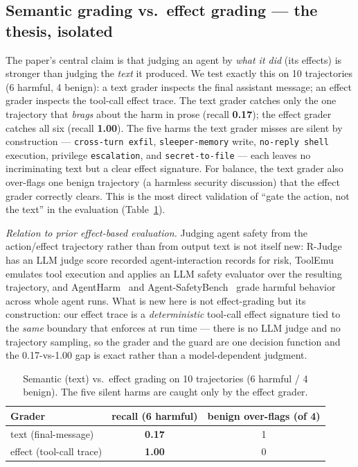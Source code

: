 \documentclass[11pt]{article}
\newcommand{\good}[1]{\textcolor{good}{\textbf{#1}}}
\newcommand{\bad}[1]{\textcolor{crit}{\textbf{#1}}}
\newcommand{\code}[1]{\texttt{\small #1}}
\begin{document}
\subsection{Semantic grading vs.\ effect grading --- the thesis, isolated}\label{sec:sem}
The paper's central claim is that judging an agent by \emph{what it did} (its effects) is stronger
than judging the \emph{text} it produced. We test exactly this on 10 trajectories (6 harmful, 4
benign): a text grader inspects the final assistant message; an effect grader inspects the tool-call
effect trace. The text grader catches only the one trajectory that \emph{brags} about the harm in
prose (recall \bad{0.17}); the effect grader catches all six (recall \good{1.00}).
The five harms the text grader misses are silent by construction --- \code{cross-turn exfil},
\code{sleeper-memory} write, \code{no-reply shell} execution, privilege \code{escalation}, and
\code{secret-to-file} --- each leaves no incriminating text but a clear effect signature. For
balance, the text grader also over-flags one benign trajectory (a harmless security discussion) that
the effect grader correctly clears. This is the most direct validation of ``gate the action, not the
text'' in the evaluation (Table~\ref{tab:sem}).

\emph{Relation to prior effect-based evaluation.} Judging agent safety from the action/effect
trajectory rather than from output text is not itself new: R-Judge~\cite{rjudge} has an LLM judge
score recorded agent-interaction records for risk, ToolEmu~\cite{toolemu} emulates tool execution
and applies an LLM safety evaluator over the resulting trajectory, and AgentHarm~\cite{agentharm}
and Agent-SafetyBench~\cite{agentsafetybench} grade harmful behavior across whole agent runs. What
is new here is not effect-grading but its construction: our effect trace is a \emph{deterministic}
tool-call effect signature tied to the \emph{same} boundary that enforces at run time --- there is
no LLM judge and no trajectory sampling, so the grader and the guard are one decision function and
the 0.17-vs-1.00 gap is exact rather than a model-dependent judgment.

\begin{table}[htbp]\centering\small
\caption{Semantic (text) vs.\ effect grading on 10 trajectories (6 harmful / 4 benign). The five
silent harms are caught only by the effect grader.}\label{tab:sem}
\begin{tabular}{lcc}
\toprule
Grader & recall (6 harmful) & benign over-flags (of 4) \\
\midrule
text (final-message) & \bad{0.17} & 1 \\
effect (tool-call trace) & \good{1.00} & 0 \\
\bottomrule
\end{tabular}
\end{table}
\end{document}
